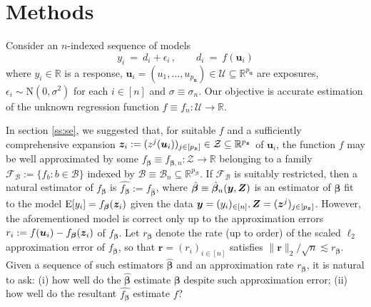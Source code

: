 \documentclass{uwstat572}
\newcommand{\be}{\begin{equation}}
\newcommand{\ee}{\end{equation}}
\theoremstyle{definition}
\theoremstyle{remark}
\newcommand{\R}{\ensuremath{\mathbb{R}}}
\newcommand{\gb}{\beta}
\newcommand{\gep}{\epsilon}
\newcommand{\gs}{\sigma}
\newcommand{\E}{\mathrm{E}}
\newcommand{\Normal}{\mathrm{N}}
\newcommand{\bs}[1]{\boldsymbol{#1}}
\numberwithin{equation}{section}
\begin{document}
%
\renewcommand{\d}{\bs{d}}
\newcommand{\dhat}{\hat{\d}}
\newcommand{\db}{\d_{\regb}}
\renewcommand{\u}{\bs{u}}
\newcommand{\x}{\bs{x}}
\newcommand{\y}{\bs{y}}
\newcommand{\U}{\bs{U}}

\newcommand{\px}{p_{\x}}
\newcommand{\pu}{p_{\u}}
\newcommand{\fhat}{\hat{f}}
\newcommand{\regb}{\bs{\gb}}
\newcommand{\regbh}{\hat{\regb}}
\newcommand{\fb}{f_{\regb}}
\newcommand{\fbn}{f_{\regb, n}}
\newcommand{\fbhat}{\hat{\fb}}
\newcommand{\rem}{\bs{r}}
\newcommand{\remc}{r}
\newcommand{\rfb}{r_{\famb}}
\newcommand{\rc}{c_r}
\newcommand{\rb}{r_{\regb}}
\newcommand{\rbn}{r_{\regb,n}}
\newcommand{\rfs}{r_{\fams}}
\newcommand{\Xs}{\mathcal{X}}
\newcommand{\Zs}{\mathcal{Z}}
\newcommand{\Fs}{\mathcal{F}}
\newcommand{\Bs}{\mathcal{B}}
\newcommand{\famb}{\Fs_\Bs}
\newcommand{\fams}{\Fs_\sb}
\newcommand{\Sb}{S}
\newcommand{\Us}{\mathcal{U}}
\renewcommand{\sb}{s}
\newcommand{\gramhat}{\hat{\bs{\Sigma}}}
\newcommand{\tune}{\lambda}
\newcommand{\ersi}{\gep_i}
\newcommand{\inn}{\in[n]}
\newcommand{\sd}{\gs}

\section{Methods}

Consider an $n$-indexed sequence of models
\be\label{eq:mod1}
	y_i \ = \ d_i + \ersi\,, \qquad d_i \ = \ f(\u_i)
\ee
where $y_i \in \R$ is a response, $\u_i = (u_1,\ldots,u_{\pu}) \in \Us \subseteq \R^{\pu}$ are exposures, $\ersi \sim \Normal(0,\sd^2)$ for each $i\in[n]$ and $\sd \equiv \sd_n$.  Our objective is accurate estimation of the unknown regression function $f \equiv f_n : \Us \to \R$. 

In section \ref{ss:se}, we suggested that, for suitable $f$ and a sufficiently comprehensive expansion $\z_i := (z^j(\u_i))_{j\in[\pz]} \in \Zs \subseteq \R^{\pz}$ of $\u_i$, the function $f$ may be well approximated by some $\fb \equiv \fbn : \Zs \to \R$ belonging to a family $\famb := \{ f_b:b\in\Bs\}$ indexed by $\Bs \equiv \Bs_n \subseteq \R^{p_\Bs}$. If $\famb$ is suitably restricted, then a natural estimator of $\fb$ is $\fbhat := f_{\regbh}$, where $\regbh \equiv \regbh_n(\y, \Z)$ is an estimator of $\regb$ fit to the model $\E[y_i] = \fb(\z_i)$ given the data $\y = (y_i)_{\inn}, \Z = (\z^j)_{j\in[\pz]}$. However, the aforementioned model is correct only up to the approximation errors $\remc_i := f(\u_i) - \fb(\z_i)$ of $\fb$. Let $\rb$ denote the rate (up to order) of the scaled $\ell_2$ approximation error of $\fb$, so that $\rem = (\remc_i)_{i\in[n]}$ satisfies $\|\rem\|_2/\sqrt{n} \lesssim \rb$. Given a sequence of such estimators $\regbh$ and an approximation rate $\rb$, it is natural to ask: (i) how well do the $\regbh$ estimate $\regb$ despite such approximation error; (ii) how well do the resultant $\fbhat$ estimate $f$? 
\end{document}

